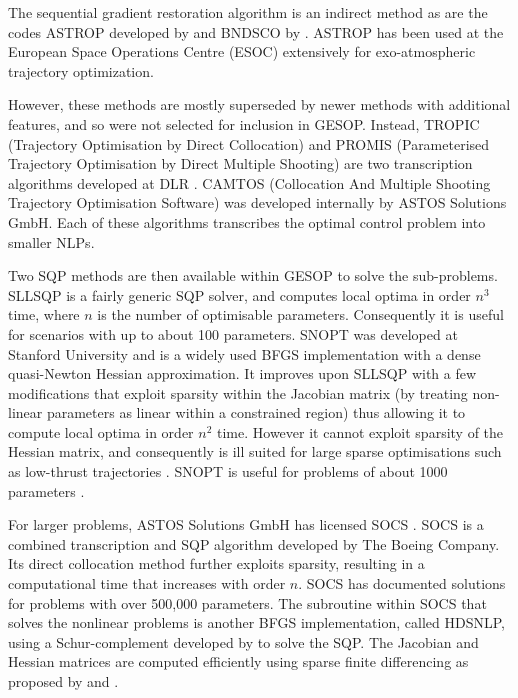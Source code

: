 The sequential gradient restoration algorithm \parencite[SGRA, ][]{Miele1975} is an indirect method as are the codes ASTROP developed by \textcite{Bartholomew-Biggs1988} and BNDSCO by \textcite{Bulirsch1971}. ASTROP has been used at the European Space Operations Centre (ESOC) extensively for exo-atmospheric trajectory optimization. 

However, these methods are mostly superseded by newer methods with additional features, and so were not selected for inclusion in GESOP. Instead, TROPIC (Trajectory Optimisation by Direct Collocation) and PROMIS (Parameterised Trajectory Optimisation by Direct Multiple Shooting) are two transcription algorithms developed at DLR \parencite{Jansch1990}. %
CAMTOS (Collocation And Multiple Shooting Trajectory Optimisation Software) was developed internally by ASTOS Solutions GmbH. Each of these algorithms transcribes the optimal control problem into smaller NLPs. 

Two SQP methods are then available within GESOP to solve the sub-problems. SLLSQP is a fairly generic SQP solver, and computes local optima in order $n^{3}$ time, where $n$ is the number of optimisable parameters. Consequently it is useful for scenarios with up to about 100 parameters. SNOPT \parencite[Sparse Nonlinear Optimizer, ][]{Gill1997} was developed at Stanford University and is a widely used BFGS implementation with a dense quasi-Newton Hessian approximation. It improves upon SLLSQP with a few modifications that exploit sparsity within the Jacobian matrix (by treating non-linear parameters as linear within a constrained region) thus allowing it to compute local optima in order $n^{2}$ time. However it cannot exploit sparsity of the Hessian matrix, and consequently is ill suited for large sparse optimisations such as low-thrust trajectories \parencite{Betts2002}. SNOPT is useful for problems of about 1000 parameters \parencite{ASTOS_guide}.

For larger problems, ASTOS Solutions GmbH has licensed SOCS \parencite[Sparse Optimal Control Software, ][]{SOCS_guide}. SOCS is a combined transcription and SQP algorithm developed by The Boeing Company. Its direct collocation method further exploits sparsity, resulting in a computational time that increases with order $n$. SOCS has documented solutions for problems with over 500,000 parameters. The subroutine within SOCS that solves the nonlinear problems is another BFGS implementation, called HDSNLP, using a Schur-complement developed by \textcite{Gill1987} to solve the SQP. The Jacobian and Hessian matrices are computed efficiently using sparse finite differencing as proposed by \textcite{Coleman1983} and \textcite{Curtis1974}.

